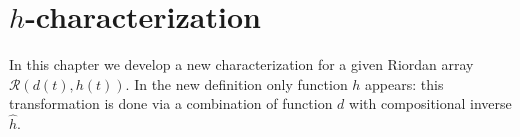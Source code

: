 
\chapter{$h$-characterization}
\label{ch:h:characterization}

In this chapter we develop a new characterization for a given Riordan array
$\mathcal{R}(d(t),h(t))$. In the new definition only function $h$ appears: this
transformation is done via a combination of function $d$ with compositional
inverse $\hat{h}$. 





